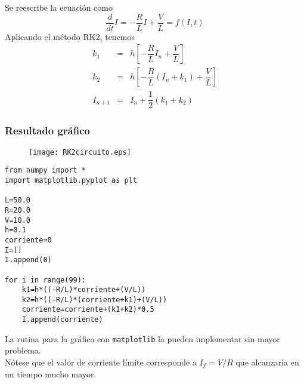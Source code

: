 \begin{frame}
Se reescribe la ecuación como
\[\dfrac{d}{dt} I = -\dfrac{R}{L} I + \dfrac{V}{L} = f(I,t)\]
Aplicando el método RK2, tenemos
\begin{eqnarray*}
k_{1} &=& h \left[-\dfrac{R}{L} I_{n} + \dfrac{V}{L} \right] \\
k_{2} &=& h \left[-\dfrac{R}{L} (I_{n}+k_{1}) + \dfrac{V}{L} \right] \\
I_{n+1} &=& I_{n} + \dfrac{1}{2} (k_{1} + k_{2})
\end{eqnarray*}
\end{frame}
\begin{frame}[fragile]
\frametitle{Resultado gráfico}
\begin{figure}
	\centering
	\texttt{[image: RK2circuito.eps]} 
\end{figure}
\end{frame}
\begin{frame}[fragile]
\fontsize{10}{10}\selectfont
\begin{lstlisting}
from numpy import *
import matplotlib.pyplot as plt

L=50.0
R=20.0
V=10.0
h=0.1
corriente=0
I=[]
I.append(0)

for i in range(99):
    k1=h*((-R/L)*corriente+(V/L))
    k2=h*((-R/L)*(corriente+k1)+(V/L))
    corriente=corriente+(k1+k2)*0.5
    I.append(corriente)
\end{lstlisting}
\end{frame}
\begin{frame}
La rutina para la gráfica con \texttt{matplotlib} la pueden implementar sin mayor problema.
\\
\bigskip
Nótese que el valor de corriente límite corresponde a $I_{f}=V/R$ que alcanzaría en un tiempo mucho mayor.
\end{frame}
